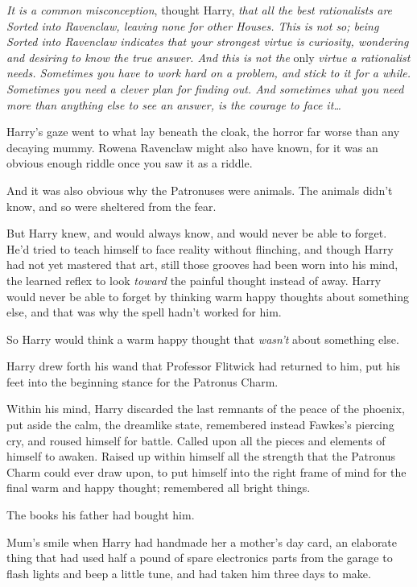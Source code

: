 \emph{It is a common misconception}, thought Harry, \emph{that all the best rationalists are Sorted into Ravenclaw, leaving none for other Houses. This is not so; being Sorted into Ravenclaw indicates that your strongest virtue is curiosity, wondering and desiring to know the true answer. And this is not the} only \emph{virtue a rationalist needs. Sometimes you have to work hard on a problem, and stick to it for a while. Sometimes you need a clever plan for finding out. And sometimes what you need more than anything else to see an answer, is the courage to face it…}

Harry’s gaze went to what lay beneath the cloak, the horror far worse than any decaying mummy. Rowena Ravenclaw might also have known, for it was an obvious enough riddle once you saw it as a riddle.

And it was also obvious why the Patronuses were animals. The animals didn’t know, and so were sheltered from the fear.

But Harry knew, and would always know, and would never be able to forget. He’d tried to teach himself to face reality without flinching, and though Harry had not yet mastered that art, still those grooves had been worn into his mind, the learned reflex to look \emph{toward} the painful thought instead of away. Harry would never be able to forget by thinking warm happy thoughts about something else, and that was why the spell hadn’t worked for him.

So Harry would think a warm happy thought that \emph{wasn’t} about something else.

Harry drew forth his wand that Professor Flitwick had returned to him, put his feet into the beginning stance for the Patronus Charm.

Within his mind, Harry discarded the last remnants of the peace of the phoenix, put aside the calm, the dreamlike state, remembered instead Fawkes’s piercing cry, and roused himself for battle. Called upon all the pieces and elements of himself to awaken. Raised up within himself all the strength that the Patronus Charm could ever draw upon, to put himself into the right frame of mind for the final warm and happy thought; remembered all bright things.

The books his father had bought him.

Mum’s smile when Harry had handmade her a mother’s day card, an elaborate thing that had used half a pound of spare electronics parts from the garage to flash lights and beep a little tune, and had taken him three days to make.

